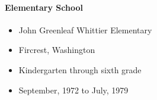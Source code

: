 \documentclass[12pt]{article}
\begin{document}
\paragraph {Elementary School}

\begin{itemize}
\item John Greenleaf Whittier Elementary
\item Fircrest, Washington
\item Kindergarten through sixth grade
\item September, 1972 to July, 1979
\end{itemize}

\end{document}
